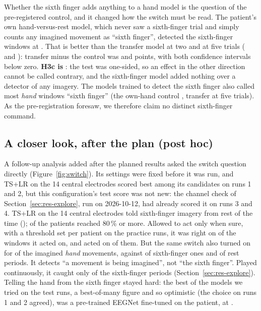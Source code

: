 Whether the sixth finger adds anything to a hand model is the question of the
pre-registered control, and it changed how the switch must be read. The patient's own
hand-versus-rest model, which never saw a sixth-finger trial and simply counts any imagined
movement as ``sixth finger'', detected the sixth-finger windows at
\pct{\rqThreeSfRestAhProxyMean}. That is better than the transfer model at two and at
five trials (\pct{\rqThreeSfRestRctTslrKTwoMean} and \pct{\rqThreeSfRestRctTslrKFiveMean}):
transfer minus the control was \rqThreeHThreeCKTwoPointsDiff{} and
\rqThreeHThreeCKFivePointsDiff{} points, with both confidence intervals below zero.
\textbf{H3c is \rqThreeHThreeCKTwoCategory}: the test was one-sided, so an effect in the
other direction cannot be called contrary, and the sixth-finger model added nothing over
a detector of any imagery. The models trained to
detect the sixth finger also called most \emph{hand} windows ``sixth finger'' (the
own-hand control \pct{\rqThreeHandAsFingerAhProxy}, transfer \pct{\rqThreeHandAsFingerRctTslrKFive}
at five trials). As the pre-registration foresaw, we therefore claim no distinct
sixth-finger command.

\subsection{A closer look, after the plan (post hoc)}
A follow-up analysis added after the planned results asked the switch question directly
(Figure~\ref{fig:switch}). Its settings were fixed before it was run, and TS+LR on the 14
central electrodes scored best among its candidates on runs 1 and 2, but this
configuration's test score was not new: the channel check of
Section~\ref{sec:res-explore}, run on 2026-10-12, had already scored it on runs 3 and 4.
TS+LR on the 14 central electrodes told sixth-finger imagery from rest
\pct{\exFourTsLrCentralMean} of the time (\ci{\exFourTsLrCentralCiLo}{\exFourTsLrCentralCiHi});
\exFourTsLrCentralNAtLeastEighty{} of the \nPre{} patients reached 80\,\% or more. Allowed to
act only when sure, with a threshold set per patient on the practice runs, it was right
on \pct{\exFourTsLrCentralSureMean} of the windows it acted on, and acted on
\pct{\exFourTsLrCentralSureShare} of them. But the same switch also turned on for
\pct{\exFourTsLrCentralFiresAhMean} of the imagined \emph{hand} movements, against
\pct{\exFourTsLrCentralFiresSfMean} of sixth-finger ones and \pct{\exFourTsLrCentralFiresRestMean}
of rest periods. It detects ``a movement is being imagined'', not ``the sixth finger''.
Played continuously, it caught only \pct{\exFiveFingerFingerOnMean} of the sixth-finger
periods (Section~\ref{sec:res-explore}). Telling the hand from the sixth finger stayed
hard: the best of the models we tried on the test runs, a best-of-many figure and so
optimistic (the choice on runs 1 and 2 agreed), was a pre-trained EEGNet fine-tuned on
the patient, at \pct{\exFourAhSfEegnetEaFtMean}.

